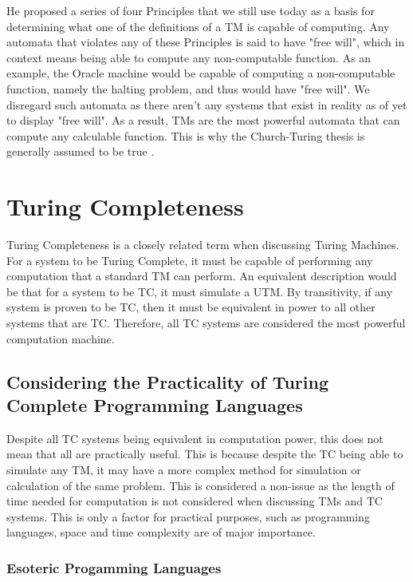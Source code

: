 He proposed a series of four Principles that we still use today as a basis for determining what one of the definitions of a TM is capable of computing.
Any automata that violates any of these Principles is said to have "free will", which in context means being able to compute any non-computable function.
As an example, the Oracle machine would be capable of computing a non-computable function, namely the halting problem, and thus would have "free will".
We disregard such automata as there aren't any systems that exist in reality as of yet to display "free will".
As a result, TMs are the most powerful automata that can compute any calculable function.
This is why the Church-Turing thesis is generally assumed to be true \cite{GandyPaper}.

\section{Turing Completeness}\label{sec:TC}

Turing Completeness is a closely related term when discussing Turing Machines.
For a system to be Turing Complete, it must be capable of performing any computation that a standard TM can perform.
An equivalent description would be that for a system to be TC, it must simulate a UTM.
By transitivity, if any system is proven to be TC, then it must be equivalent in power to all other systems that are TC.
Therefore, all TC systems are considered the most powerful computation machine.

\subsection{Considering the Practicality of Turing Complete Programming Languages}\label{subsec:PracticalTC}

Despite all TC systems being equivalent in computation power, this does not mean that all are practically useful.
This is because despite the TC being able to simulate any TM, it may have a more complex method for simulation or calculation of the same problem.
This is considered a non-issue as the length of time needed for computation is not considered when discussing TMs and TC systems.
This is only a factor for practical purposes, such as programming languages, space and time complexity are of major importance.

\subsubsection{Esoteric Progamming Languages}\label{subsubsec:EsotericPL}

